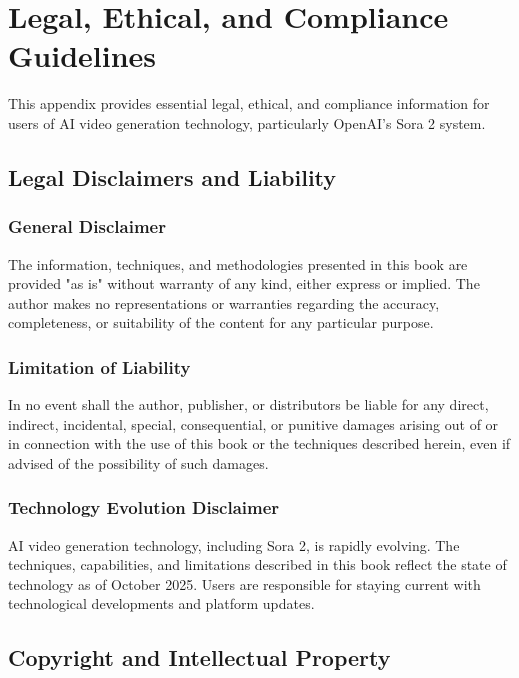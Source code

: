 \chapter{Legal, Ethical, and Compliance Guidelines}
\label{app:legal-ethics}

This appendix provides essential legal, ethical, and compliance information for users of AI video generation technology, particularly OpenAI's Sora 2 system.

\section{Legal Disclaimers and Liability}

\subsection{General Disclaimer}
The information, techniques, and methodologies presented in this book are provided "as is" without warranty of any kind, either express or implied. The author makes no representations or warranties regarding the accuracy, completeness, or suitability of the content for any particular purpose.

\subsection{Limitation of Liability}
In no event shall the author, publisher, or distributors be liable for any direct, indirect, incidental, special, consequential, or punitive damages arising out of or in connection with the use of this book or the techniques described herein, even if advised of the possibility of such damages.

\subsection{Technology Evolution Disclaimer}
AI video generation technology, including Sora 2, is rapidly evolving. The techniques, capabilities, and limitations described in this book reflect the state of technology as of October 2025. Users are responsible for staying current with technological developments and platform updates.

\section{Copyright and Intellectual Property}

